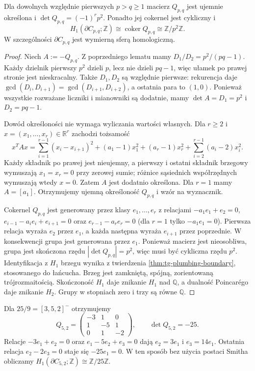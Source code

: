 \begin{twierdzenie}
\label{thm:tg-general-algebra}
Dla dowolnych względnie pierwszych $p>q\geq1$ macierz
$Q_{p,q}$ jest ujemnie określona i
$\det Q_{p,q}=(-1)^r p^2$.
Ponadto jej cokernel jest cykliczny i
\[
H_1(\partial C_{p,q};\mathbb Z)
\cong\operatorname{coker}Q_{p,q}
\cong\mathbb Z/p^2\mathbb Z.
\]
W szczególności $\partial C_{p,q}$ jest wymierną sferą
homologiczną.
\end{twierdzenie}

\begin{proof}
Niech $A:=-Q_{p,q}$. Z poprzedniego lematu mamy
$D_1/D_2=p^2/(pq-1)$. Każdy dzielnik pierwszy
$p^2$ dzieli $p$, lecz nie dzieli $pq-1$,
więc ułamek po prawej stronie jest nieskracalny.
Także $D_1,D_2$ są względnie pierwsze: rekurencja
daje $\gcd(D_i,D_{i+1})=\gcd(D_{i+1},D_{i+2})$,
a ostatnia para to $(1,0)$.
Ponieważ wszystkie rozważane liczniki i mianowniki
są dodatnie, mamy $\det A=D_1=p^2$ i $D_2=pq-1$.

Dowód określoności nie wymaga wyliczania wartości własnych.
Dla $r\geq2$ i $x=(x_1,\ldots,x_r)\in\mathbb R^r$
zachodzi tożsamość
\[
x^TAx=\sum_{i=1}^{r-1}(x_i-x_{i+1})^2
+(a_1-1)x_1^2+(a_r-1)x_r^2
+\sum_{i=2}^{r-1}(a_i-2)x_i^2.
\]
Każdy składnik po prawej jest nieujemny, a pierwszy i ostatni
składnik brzegowy wymuszają $x_1=x_r=0$ przy zerowej sumie;
różnice sąsiednich współrzędnych wymuszają wtedy $x=0$.
Zatem $A$ jest dodatnio określona. Dla $r=1$ mamy $A=[a_1]$.
Otrzymujemy ujemną określoność $Q_{p,q}$ i wzór na wyznacznik.

Cokernel $Q_{p,q}$ jest generowany przez klasy
$e_1,\ldots,e_r$ z relacjami
$-a_1e_1+e_2=0$, $e_{i-1}-a_ie_i+e_{i+1}=0$
oraz $e_{r-1}-a_re_r=0$ (dla $r=1$ tylko
$-a_1e_1=0$). Pierwsza relacja wyraża $e_2$ przez $e_1$,
a każda następna wyraża $e_{i+1}$ przez poprzednie.
W konsekwencji grupa jest generowana przez $e_1$.
Ponieważ macierz jest nieosobliwa, grupa jest skończona rzędu
$|\det Q_{p,q}|=p^2$, więc musi być cykliczna rzędu $p^2$.
Identyfikacja z $H_1$ brzegu wynika z twierdzenia
\ref{thm:tg-plumbing-boundary}, stosowanego do łańcucha.
Brzeg jest zamkniętą, spójną, zorientowaną
trójrozmaitością. Skończoność $H_1$ daje znikanie
$H_1$ nad $\mathbb Q$, a dualność Poincarégo
daje znikanie $H_2$. Grupy w stopniach zero
i trzy są równe $\mathbb Q$.
\end{proof}

\begin{przyklad}
Dla $25/9=[3,5,2]^-$ otrzymujemy
\[
Q_{5,2}=\begin{pmatrix}-3&1&0\\1&-5&1\\0&1&-2\end{pmatrix},
\qquad\det Q_{5,2}=-25.
\]
Relacje $-3e_1+e_2=0$ oraz
$e_1-5e_2+e_3=0$ dają $e_2=3e_1$ i $e_3=14e_1$.
Ostatnia relacja $e_2-2e_3=0$ staje się
$-25e_1=0$. W ten sposób bez użycia postaci Smitha
obliczamy $H_1(\partial C_{5,2};\mathbb Z)\cong\mathbb Z/25\mathbb Z$.
\end{przyklad}

